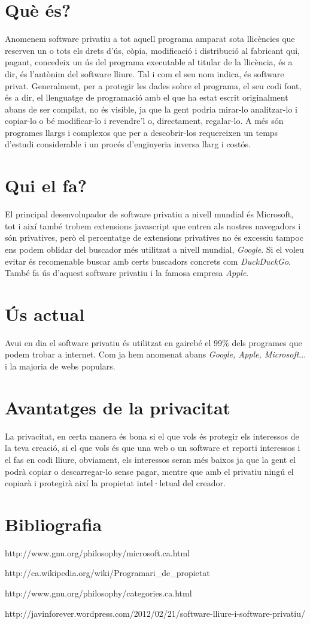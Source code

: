 \section{Què és?}

Anomenem software privatiu a tot aquell programa amparat sota llicències
que reserven un o tots els drets d'ús, còpia, modificació i distribució
al fabricant qui, pagant, concedeix un ús del programa executable al titular
de la llicència, és a dir, és l'antònim del software lliure. Tal i com el 
seu nom indica, és software privat. Generalment, per a protegir les dades 
sobre el programa, el seu codi font, és a dir, el llenguatge de programació 
amb el que ha estat escrit originalment abans de ser compilat, no és visible, 
ja que la gent podria mirar-lo analitzar-lo i copiar-lo o bé modificar-lo 
i revendre'l o, directament, regalar-lo. A més són programes llargs i complexos
 que per a descobrir-los requereixen un temps d'estudi considerable i un procés d'enginyeria inversa llarg i costós.

\section{Qui el fa?}

El principal desenvolupador de software privatiu a nivell mundial és Microsoft, 
tot i així també trobem extensions javascript que entren als nostres navegadors 
i són privatives, però el percentatge de extensions privatives no és excessiu 
tampoc ens podem oblidar del buscador més utilitzat a nivell mundial, 
\emph{Google}.  Si el voleu evitar és recomenable buscar amb certs buscadors concrets 
com \emph{DuckDuckGo}. També fa ús d'aquest software privatiu i la famosa empresa
\emph{Apple}.

\section{Ús actual}

Avui en dia el software privatiu és utilitzat en gairebé el 99\% dels programes que
podem trobar a internet. Com ja hem anomenat abans \emph{Google, Apple, Microsoft}...
i la majoria de webs populars.

\section{Avantatges de la privacitat}

La privacitat, en certa manera és bona si el que vols és protegir els interessos de
la teva creació, si el que vols és que una web o un software et reporti interessos 
i el fas en codi lliure, obviament, els interessos seran més baixos ja que la gent 
el podrà copiar o descarregar-lo sense pagar, mentre que amb el privatiu ningú el
copiarà i protegirà així la propietat intel·letual del creador.

\section{Bibliografia}

http://www.gnu.org/philosophy/microsoft.ca.html

http://ca.wikipedia.org/wiki/Programari\_de\_propietat

http://www.gnu.org/philosophy/categories.ca.html

http://javinforever.wordpress.com/2012/02/21/software-lliure-i-software-privatiu/

